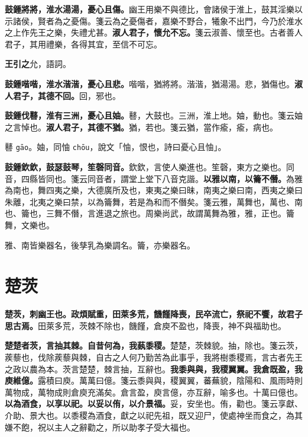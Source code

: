\textbf{鼓鍾將將，淮水湯湯，憂心且傷。}{\footnotesize 幽王用樂不與德比，會諸侯于淮上，鼓其淫樂以示諸侯，賢者為之憂傷。箋云為之憂傷者，嘉樂不野合，犧象不出門，今乃於淮水之上作先王之樂，失禮尤甚。}\textbf{淑人君子，懷允不忘。}{\footnotesize 箋云淑善、懷至也。古者善人君子，其用禮樂，各得其宜，至信不可忘。}

\begin{quoting}\textbf{王引之}允，語詞。\end{quoting}

\textbf{鼓鍾喈喈，淮水湝湝，憂心且悲。}{\footnotesize 喈喈，猶將將。湝湝，猶湯湯。悲，猶傷也。}\textbf{淑人君子，其德不回。}{\footnotesize 回，邪也。}

\textbf{鼓鍾伐鼛，淮有三洲，憂心且妯。}{\footnotesize 鼛，大鼓也。三洲，淮上地。妯，動也。箋云妯之言悼也。}\textbf{淑人君子，其德不猶。}{\footnotesize 猶，若也。箋云猶，當作瘉，瘉，病也。}

\begin{quoting}鼛 \texttt{gāo}。妯，同怞 \texttt{chōu}，說文「怞，恨也，詩曰憂心且怞」。\end{quoting}

\textbf{鼓鍾欽欽，鼓瑟鼓琴，笙磬同音。}{\footnotesize 欽欽，言使人樂進也。笙磬，東方之樂也。同音，四縣皆同也。箋云同音者，謂堂上堂下八音克諧。}\textbf{以雅以南，以籥不僭。}{\footnotesize 為雅為南也，舞四夷之樂，大德廣所及也，東夷之樂曰昧，南夷之樂曰南，西夷之樂曰朱離，北夷之樂曰禁，以為籥舞，若是為和而不僭矣。箋云雅，萬舞也，萬也、南也、籥也，三舞不僭，言進退之旅也。周樂尚武，故謂萬舞為雅，雅，正也。籥舞，文樂也。}

\begin{quoting}雅、南皆樂器名，後孳乳為樂調名。籥，亦樂器名。\end{quoting}

\section{楚茨}


\textbf{楚茨，刺幽王也。政煩賦重，田萊多荒，饑饉降喪，民卒流亡，祭祀不饗，故君子思古焉。}{\footnotesize 田萊多荒，茨棘不除也，饑饉，倉庾不盈也，降喪，神不與福助也。}

\textbf{楚楚者茨，言抽其棘。自昔何為，我蓺黍稷。}{\footnotesize 楚楚，茨棘貌。抽，除也。箋云茨，蒺藜也，伐除蒺藜與棘，自古之人何乃勤苦為此事乎，我將樹黍稷焉，言古者先王之政以農為本。茨言楚楚，棘言抽，互辭也。}\textbf{我黍與與，我稷翼翼。我倉既盈，我庾維億。}{\footnotesize 露積曰庾。萬萬曰億。箋云黍與與，稷翼翼，蕃蕪貌，陰陽和、風雨時則萬物成，萬物成則倉庾充滿矣。倉言盈，庾言億，亦互辭，喻多也。十萬曰億也。}\textbf{以為酒食，以享以祀。以妥以侑，以介景福。}{\footnotesize 妥，安坐也。侑，勸也。箋云享獻、介助、景大也。以黍稷為酒食，獻之以祀先祖，既又迎尸，使處神坐而食之，為其嫌不飽，祝以主人之辭勸之，所以助孝子受大福也。}


